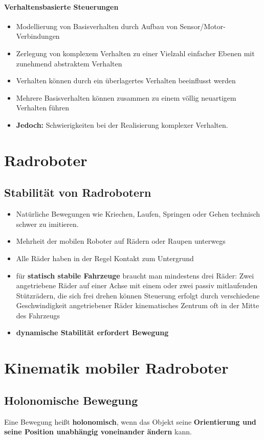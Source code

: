 \paragraph{Verhaltensbasierte Steuerungen}
\begin{itemize}
	\item Modellierung von Basisverhalten durch Aufbau von Sensor/Motor-Verbindungen
	\item Zerlegung von komplexem Verhalten zu einer Vielzahl einfacher Ebenen mit zunehmend abstraktem Verhalten
	\item Verhalten können durch ein überlagertes Verhalten beeinflusst werden
	\item Mehrere Basisverhalten können zusammen zu einem völlig neuartigem Verhalten führen
	\item \textbf{Jedoch:} Schwierigkeiten bei der Realisierung komplexer Verhalten.
\end{itemize}
\section{Radroboter}
\subsection{Stabilität von Radrobotern}
\begin{itemize}
	\item Natürliche Bewegungen wie Kriechen, Laufen, Springen oder Gehen technisch schwer zu imitieren.
	\item Mehrheit der mobilen Roboter auf Rädern oder Raupen unterwegs
	\item Alle Räder haben in der Regel Kontakt zum Untergrund
	\item für \textbf{statisch stabile Fahrzeuge} braucht man mindestens drei Räder:
	\subitem Zwei angetriebene Räder auf einer Achse mit einem oder zwei passiv mitlaufenden Stützrädern, die sich frei drehen können
	\subitem Steuerung erfolgt durch verschiedene Geschwindigkeit angetriebener Räder
	\subitem kinematisches Zentrum oft in der Mitte des Fahrzeugs
	\item \textbf{dynamische Stabilität erfordert Bewegung}
\end{itemize}
\section{Kinematik mobiler Radroboter}
\subsection{Holonomische Bewegung}
Eine Bewegung heißt \textbf{holonomisch}, wenn das Objekt seine \textbf{Orientierung und seine Position unabhängig voneinander ändern} kann.
